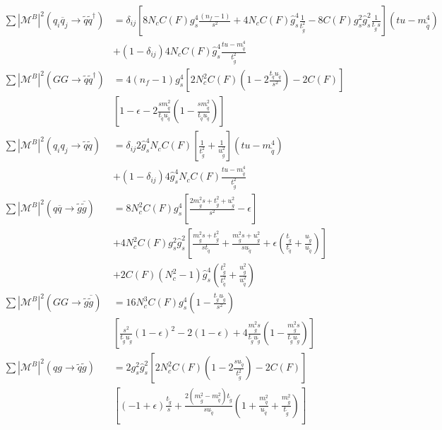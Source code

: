 \begin{align}
\sum|\mathcal{M}^B|^2(q_i\overline{q}_j \to \tilde{q}\tilde{q}^\dagger) &= \delta_{ij}  \left[ 8 N_c C(F) g_s^4\frac{(n_f-1)}{s^2} + 4 N_c C(F) \hat{g}_s^4\frac{1}{t_{\tilde{g}}^2} - 8 C(F)g_s^2\hat{g}_s^2\frac{1}{ t_{\tilde{g}} s} \right] (tu-m_{\tilde{q}}^4)\nonumber\\
 &+ (1-\delta_{ij}) 4 N_c C(F) \hat{g}_s^4\frac{tu-m_{\tilde{q}}^4}{t_{\tilde{g}}^2} \\
\sum|\mathcal{M}^B|^2(GG \to \tilde{q}\tilde{q}^\dagger) &= 4 (n_f-1) g_s^4 \left[ 2N_c^2C(F) \left(1 - 2\frac{t_{\tilde{q}}u_{\tilde{q}}}{s^2} \right)- 2C(F) \right]\nonumber\\
& \left[ 1 - \epsilon - 2\frac{s m_{\tilde{q}}^2}{t_{\tilde{q}}u_{\tilde{q}}} \left( 1-\frac{s m_{\tilde{q}}^2}{t_{\tilde{q}}u_{\tilde{q}}} \right)\right]\\
\sum|\mathcal{M}^B|^2(q_i q_j \to \tilde{q}\tilde{q}) &= \delta_{ij} 2\hat{g}_s^4 N_c C(F)\left[ \frac{1}{t_{\tilde{g}}^2} + \frac{1}{u_{\tilde{g}}^2} \right] (tu-m_{\tilde{q}}^4)\nonumber\\ 
& + (1-\delta_{ij}) 4 \hat{g}_s^4 N_c C(F) \frac{tu-m_{\tilde{q}}^4}{t_{\tilde{g}}^2}\\
\sum|\mathcal{M}^B|^2(q\overline{q} \to \tilde{g}\overline{\tilde{g}}) &=  8 N_c^2 C(F) g_s^4 \left[ \frac{2m_{\tilde{g}}^2 s + t_{\tilde{g}}^2 + u_{\tilde{g}}^2}{s^2} -\epsilon \right]\nonumber\\
& + 4 N_c^2 C(F) g_s^2 \hat{g}_s^2 \left[ \frac{m_{\tilde{g}}^2 s + t_{\tilde{g}}^2}{s t_{\tilde{q}}} + \frac{m_{\tilde{g}}^2 s + u_{\tilde{g}}^2}{su_{\tilde{q}}} + \epsilon\left( \frac{t_{\tilde{g}}}{t_{\tilde{q}}} + \frac{u_{\tilde{g}}}{u_{\tilde{q}}} \right) \right]\nonumber\\
& + 2C(F)(N_c^2-1) \hat{g}^4_s \left( \frac{t_{\tilde{g}}^2}{t_{\tilde{q}}^2} + \frac{u_{\tilde{g}}^2}{u_{\tilde{q}}^2} \right)\\
\sum|\mathcal{M}^B|^2(GG \to \tilde{g}\overline{\tilde{g}}) &=  16 N_c^3 C(F) g_s^4 \left( 1- \frac{t_{\tilde{g}}u_{\tilde{g}}}{s^2} \right)\nonumber\\
&\left[ \frac{s^2}{t_{\tilde{g}}u_{\tilde{g}}}(1-\epsilon)^2-2(1-\epsilon) + 4\frac{m_{\tilde{g}}^2 s}{t_{\tilde{g}}u_{\tilde{g}}}\left(1-\frac{m_{\tilde{g}}^2 s}{t_{\tilde{g}}u_{\tilde{g}}}  \right) \right]\\
\sum|\mathcal{M}^B|^2(qg \to \tilde{q}\tilde{g}) &=  2g_s^2\hat{g}_s^2 \left[ 2 N_c^2 C(F) \left(1-2\frac{s u_{\tilde{q}}}{t_{\tilde{g}}^2}\right) - 2C(F) \right] \nonumber\\
&\left[ (-1+\epsilon)\frac{t_{\tilde{g}}}{s} + \frac{2(m_{\tilde{g}}^2-m_{\tilde{q}}^2)t_{\tilde{g}}}{s u_{\tilde{q}}}\left( 1+\frac{m_{\tilde{q}}^2}{u_{\tilde{q}}} + \frac{m_{\tilde{g}}^2}{t_{\tilde{g}}} \right) \right]
\end{align}
